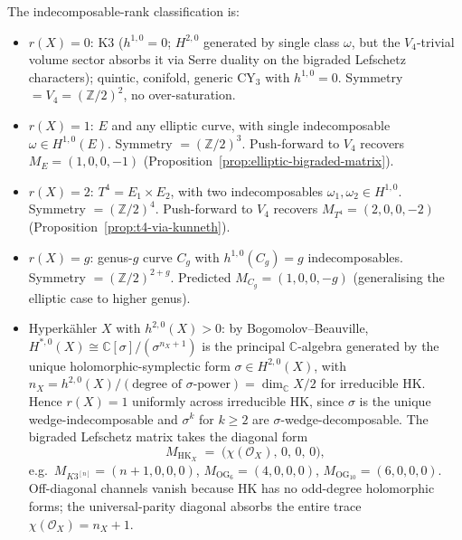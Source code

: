 \begin{remark}
\label{rem:hodge-saturation-cases}
The indecomposable-rank classification is:
\begin{itemize}
\item $r(X) = 0$: K$3$ \textup{(}$h^{1, 0} = 0$; $H^{2, 0}$ generated
 by single class $\omega$, but the $V_4$-trivial volume sector
 absorbs it via Serre duality on the bigraded Lefschetz
 characters\textup{);} quintic, conifold, generic CY$_3$ with
 $h^{1, 0} = 0$. Symmetry $= V_4 = (\mathbb{Z}/2)^2$, no
 over-saturation.
\item $r(X) = 1$: $E$ and any elliptic curve, with single
 indecomposable $\omega \in H^{1, 0}(E)$. Symmetry
 $= (\mathbb{Z}/2)^3$. Push-forward to $V_4$ recovers
 $M_E = (1, 0, 0, -1)$
 \textup{(}Proposition~\ref{prop:elliptic-bigraded-matrix}\textup{).}
\item $r(X) = 2$: $T^4 = E_1 \times E_2$, with two indecomposables
 $\omega_1, \omega_2 \in H^{1, 0}$. Symmetry $= (\mathbb{Z}/2)^4$.
 Push-forward to $V_4$ recovers $M_{T^4} = (2, 0, 0, -2)$
 \textup{(}Proposition~\ref{prop:t4-via-kunneth}\textup{).}
\item $r(X) = g$: genus-$g$ curve $C_g$ with $h^{1, 0}(C_g) = g$
 indecomposables. Symmetry $= (\mathbb{Z}/2)^{2 + g}$.
 Predicted $M_{C_g} = (1, 0, 0, -g)$ \textup{(}generalising the
 elliptic case to higher genus\textup{).}
\item Hyperkähler $X$ with $h^{2, 0}(X) > 0$: by Bogomolov--Beauville,
 $H^{*, 0}(X) \cong \mathbb{C}[\sigma]/(\sigma^{n_X + 1})$ is the
 principal $\mathbb{C}$-algebra generated by the unique
 holomorphic-symplectic form $\sigma \in H^{2, 0}(X)$, with
 $n_X = h^{2, 0}(X)/(\text{degree of }\sigma\text{-power}) =
 \dim_\mathbb{C} X / 2$ for irreducible HK. Hence $r(X) = 1$
 uniformly across irreducible HK, since $\sigma$ is the unique
 wedge-indecomposable and $\sigma^k$ for $k \geq 2$ are
 $\sigma$-wedge-decomposable. The bigraded Lefschetz matrix
 takes the diagonal form
 \[
 M_{\mathrm{HK}_X} \;=\; \bigl(\chi(\mathcal{O}_X),\, 0,\, 0,\, 0\bigr),
 \]
 e.g.\ $M_{K3^{[n]}} = (n + 1, 0, 0, 0)$,
 $M_{\mathrm{OG}_6} = (4, 0, 0, 0)$,
 $M_{\mathrm{OG}_{10}} = (6, 0, 0, 0)$. Off-diagonal channels
 vanish because HK has no odd-degree holomorphic forms; the
 universal-parity diagonal absorbs the entire trace
 $\chi(\mathcal{O}_X) = n_X + 1$.
\end{itemize}
\end{remark}

